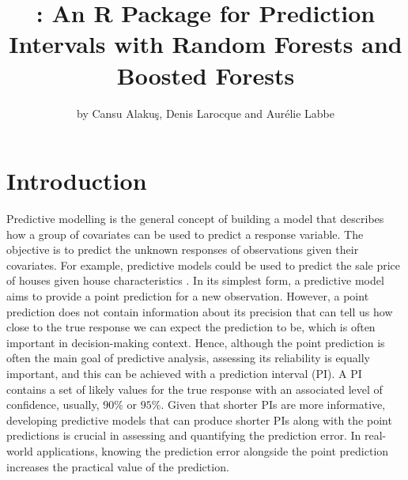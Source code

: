 \title{: An R Package for Prediction Intervals with Random Forests and Boosted Forests}
\author{by Cansu Alakuş, Denis Larocque and Aur\'elie Labbe}

\maketitle


\section{Introduction}

Predictive modelling is the general concept of building a model that describes how a group of covariates can be used to predict a response variable. The objective is to predict the unknown responses of observations given their covariates. For example, predictive models could be used to predict the sale price of houses given house characteristics \citep{de_cock_ames_2011}. In its simplest form, a predictive model aims to provide a point prediction for a new observation. However, a point prediction does not contain information about its precision that can tell us how close to the true response we can expect the prediction to be, which is often important in decision-making context. Hence, although the point prediction is often the main goal of predictive analysis, assessing its reliability is equally important, and this can be achieved with a prediction interval (PI). A PI contains a set of likely values for the true response with an associated level of confidence, usually, $90\%$ or $95\%$. Given that shorter PIs are more informative, developing predictive models that can produce shorter PIs along with the point predictions is crucial in assessing and quantifying the prediction error. In real-world applications, knowing the prediction error alongside the point prediction increases the practical value of the prediction.

